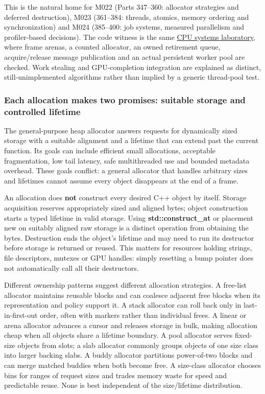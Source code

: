 This is the natural home for M022 (Parts 347--360: allocator strategies and deferred destruction), M023 (361--384: threads, atomics, memory ordering and synchronization) and M024 (385--400: job systems, measured parallelism and profiler-based decisions). The code witness is the same \href{tools/labs/phase4_cpu_systems_lab.cpp}{CPU systems laboratory}, where frame arenas, a counted allocator, an owned retirement queue, acquire/release message publication and an actual persistent worker pool are checked. Work stealing and GPU-completion integration are explained as distinct, still-unimplemented algorithms rather than implied by a generic thread-pool test.

\subsubsection{Each allocation makes two promises: suitable storage and controlled lifetime}\label{each-allocation-makes-two-promises-suitable-storage-and-controlled-lifetime}

The general-purpose heap allocator answers requests for dynamically sized storage with a suitable alignment and a lifetime that can extend past the current function. Its goals can include efficient small allocations, acceptable fragmentation, low tail latency, safe multithreaded use and bounded metadata overhead. These goals conflict: a general allocator that handles arbitrary sizes and lifetimes cannot assume every object disappears at the end of a frame.

An allocation does \textbf{not} construct every desired C++ object by itself. Storage acquisition reserves appropriately sized and aligned bytes; object construction starts a typed lifetime in valid storage. Using \textbf{std::construct\_at} or placement new on suitably aligned raw storage is a distinct operation from obtaining the bytes. Destruction ends the object's lifetime and may need to run its destructor before storage is returned or reused. This matters for resources holding strings, file descriptors, mutexes or GPU handles: simply resetting a bump pointer does not automatically call all their destructors.

Different ownership patterns suggest different allocation strategies. A free-list allocator maintains reusable blocks and can coalesce adjacent free blocks when its representation and policy support it. A stack allocator can roll back only in last-in-first-out order, often with markers rather than individual frees. A linear or arena allocator advances a cursor and releases storage in bulk, making allocation cheap when all objects share a lifetime boundary. A pool allocator serves fixed-size objects from slots; a slab allocator commonly groups objects of one size class into larger backing slabs. A buddy allocator partitions power-of-two blocks and can merge matched buddies when both become free. A size-class allocator chooses bins for ranges of request sizes and trades memory waste for speed and predictable reuse. None is best independent of the size/lifetime distribution.

